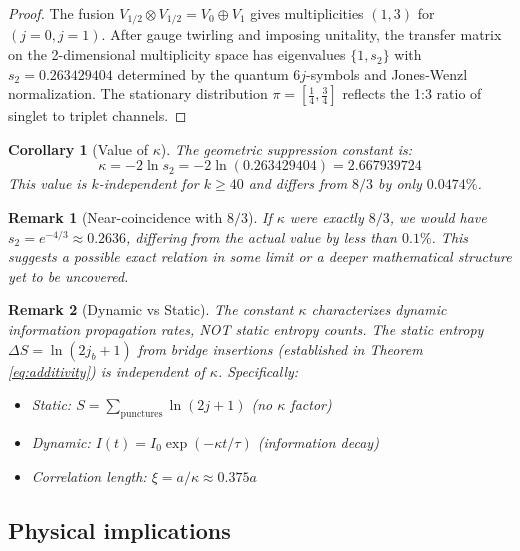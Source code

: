 \documentclass[11pt]{article}
\newtheorem{remark}{Remark}[section]
\newtheorem{corollary}{Corollary}
\begin{document}
\begin{proof}
  The fusion $V_{1/2} \otimes V_{1/2} = V_0 \oplus V_1$ gives multiplicities $(1, 3)$ for $(j=0, j=1)$. After gauge twirling and imposing unitality, the transfer matrix on the 2-dimensional multiplicity space has eigenvalues $\{1, s_2\}$ with $s_2 = 0.263429404$ determined by the quantum $6j$-symbols and Jones-Wenzl normalization. The stationary distribution $\pi = [\frac{1}{4}, \frac{3}{4}]$ reflects the 1:3 ratio of singlet to triplet channels.
\end{proof}

\begin{corollary}[Value of $\kappa$]
  The geometric suppression constant is:
  \begin{equation}
    \boxed{\kappa = -2\ln s_2 = -2\ln(0.263429404) = 2.667939724}
  \end{equation}
  This value is $k$-independent for $k \geq 40$ and differs from $8/3$ by only $0.0474\%$.
\end{corollary}

\begin{remark}[Near-coincidence with $8/3$]
  If $\kappa$ were exactly $8/3$, we would have $s_2 = e^{-4/3} \approx 0.2636$, differing from the actual value by less than $0.1\%$. This suggests a possible exact relation in some limit or a deeper mathematical structure yet to be uncovered.
\end{remark}

\begin{remark}[Dynamic vs Static]
  The constant $\kappa$ characterizes \emph{dynamic} information propagation rates, NOT static entropy counts. The static entropy $\Delta S = \ln(2j_b+1)$ from bridge insertions (established in Theorem \ref{eq:additivity}) is independent of $\kappa$. Specifically:
  \begin{itemize}
    \item Static: $S = \sum_{\text{punctures}} \ln(2j + 1)$ (no $\kappa$ factor)
    \item Dynamic: $I(t) = I_0 \exp(-\kappa t/\tau)$ (information decay)
    \item Correlation length: $\xi = a/\kappa \approx 0.375a$
  \end{itemize}
\end{remark}

\subsection{Physical implications}
\end{document}
